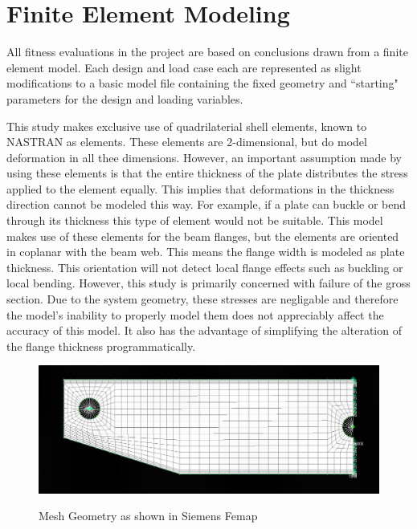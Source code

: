 \section{Finite Element Modeling}

All fitness evaluations in the project are based on conclusions drawn from a finite element model. Each design and load case each are represented as slight modifications to a basic model file containing the fixed geometry and ``starting" parameters for the design and loading variables.  

This study makes exclusive use of quadrilaterial shell elements, known to NASTRAN as  elements. These elements are 2-dimensional, but do model deformation in all thee dimensions. However, an important assumption made by using these elements is that the entire thickness of the plate distributes the stress applied to the element equally. This implies that deformations in the thickness direction cannot be modeled this way. For example, if a plate can buckle or bend through its thickness this type of element would not be suitable. This model makes use of these elements for the beam flanges, but the elements are oriented in coplanar with the beam web. This means the flange width is modeled as plate thickness. This orientation will not detect local flange effects such as buckling or local bending. However, this study is primarily concerned with failure of the gross section. Due to the system geometry, these stresses are negligable and therefore the model's inability to properly model them does not appreciably affect the accuracy of this model. It also has the advantage of simplifying the alteration of the flange thickness programmatically. 

\begin{figure}
\includegraphics[width=\textwidth]{img/mesh_geom.png}
\label{img:mesh_geom}
\caption{Mesh Geometry as shown in Siemens Femap}
\end{figure}
